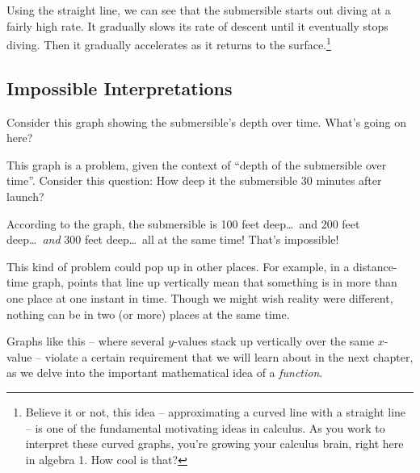 Using the straight line, we can see that the submersible starts out diving at a fairly high rate. It gradually slows its rate of descent until it eventually stops diving. Then it gradually accelerates as it returns to the surface.\footnote{Believe it or not, this idea -- approximating a curved line with a straight line -- is one of the fundamental motivating ideas in calculus. As you work to interpret these curved graphs, you're growing your calculus brain, right here in algebra 1. How cool is that?}

\subsection{Impossible Interpretations}

Consider this graph showing the submersible's depth over time. What's going on here?

\begin{center}
\end{center}

This graph is a problem, given the context of ``depth of the submersible over time''. Consider this question: How deep it the submersible 30 minutes after launch?

According to the graph, the submersible is 100 feet deep\ldots\ and 200 feet deep\ldots\ \textit{and} 300 feet deep\ldots\ all at the same time! That's impossible!

This kind of problem could pop up in other places. For example, in a distance-time graph, points that line up vertically mean that something is in more than one place at one instant in time. Though we might wish reality were different, nothing can be in two (or more) places at the same time.

Graphs like this -- where several $y$-values stack up vertically over the same $x$-value -- violate a certain requirement that we will learn about in the next chapter, as we delve into the important mathematical idea of a \textit{function}.
